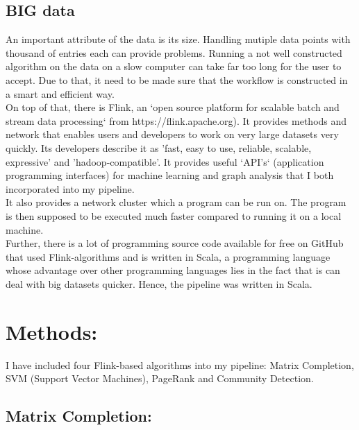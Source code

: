 \documentclass{bioinfo}
\begin{document}
\subsection{BIG data}
An important attribute of the data is its size. Handling mutiple data points with thousand of entries each can provide problems. Running a not well constructed algorithm on the data on a slow computer can take far too long for the user to accept. Due to that, it need to be made sure that the workflow is constructed in a smart and efficient way.\\
On top of that, there is Flink, an `open source platform for scalable batch and stream data processing` from https://flink.apache.org). It provides methods and network that enables users and developers to work on very large datasets very quickly. Its developers describe it as 'fast, easy to use, reliable, scalable, expressive' and 'hadoop-compatible'. It provides useful `API's` (application programming interfaces) for machine learning and graph analysis that I both incorporated into my pipeline.\\
It also provides a network cluster which a program can be run on. The program is then supposed to be executed much faster compared to running it on a local machine.\\
Further, there is a lot of programming source code available for free on GitHub that used Flink-algorithms and is written in Scala, a programming language whose advantage over other programming languages lies in the fact that is can deal with big datasets quicker. Hence, the pipeline was written in Scala.\\
 

 

\section{Methods:}
 

I have included four Flink-based algorithms into my pipeline: Matrix Completion, SVM (Support Vector Machines), PageRank and Community Detection.

 

\subsection{Matrix Completion: }
\label{matrixcompletion_algo}

  
\end{document}

